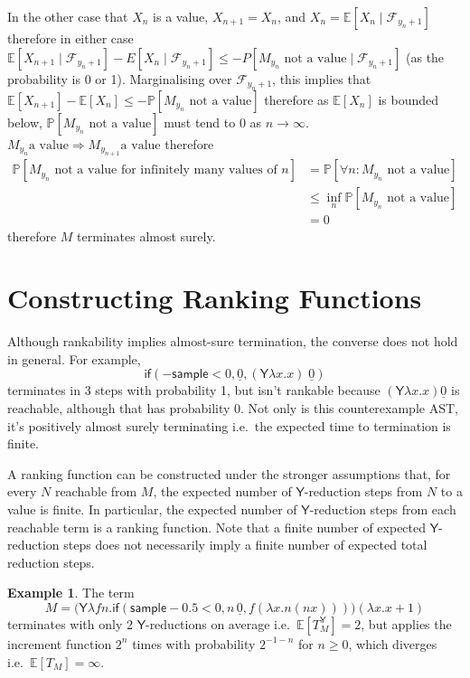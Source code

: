 \documentclass{article}
\newcommand\expect[1]{\mathbb{E}[#1]}
\newcommand{\tY}{\mathsf{Y}}
\newcommand{\tif}[3]{\mathsf{if}(#1, #2, #3)} %
\newcommand{\tsample}{\mathsf{sample}}
\theoremstyle{definition}
\newtheorem{example}{Example}
\theoremstyle{lemma}
\theoremstyle{remark}
\begin{document}
In the other case that $X_n$ is a value, $X_{n+1} = X_n$, and $X_n = \mathbb E[X_n \mid \mathcal F_{y_n+1}]$ therefore in either case $\mathbb E[X_{n+1} \mid \mathcal F_{y_n+1}] - E[X_n \mid \mathcal F_{y_n+1}] \leq \mathbb -P[M_{y_n} \text{ not a value} \mid \mathcal F_{y_n+1}]$ (as the probability is 0 or 1). Marginalising over $\mathcal F_{y_n+1}$, this implies that $\mathbb{E}[X_{n+1}] - \mathbb{E}[X_{n}] \leq -\mathbb P[M_{y_n} \text{ not a value}]$ therefore as $\mathbb{E}[X_n]$ is bounded below, $\mathbb P[M_{y_n} \text{ not a value}]$ must tend to 0 as $n \to \infty$. $M_{y_n} \text{a value} \Rightarrow M_{y_{n+1}} \text{a value}$ therefore 
\begin{align*}
\mathbb P[M_{y_n} \text{ not a value for infinitely many values of $n$}]  
& = \mathbb P[\forall n: M_{y_n} \text{ not a value}] \\
& \leq \inf_n \mathbb P[M_{y_n} \text{ not a value}] \\
& = 0
\end{align*} 
therefore $M$ terminates almost surely.



\section{Constructing Ranking Functions}
Although rankability implies almost-sure termination, the converse does not hold in general. For example,
\begin{equation}
\tif{{-}\tsample < 0}{\underline{0}}{(\tY \lambda x. x) \; \underline 0}
\label{ex:0 probability reachable}
\end{equation}
terminates in 3 steps with probability 1, but isn't rankable because $(\tY \lambda x. x) \underline 0$ is reachable, although that has probability 0. 
Not only is this counterexample AST, it's positively almost surely terminating i.e.~the expected time to termination is finite.

A ranking function can be constructed under the stronger assumptions that, for every $N$ reachable from $M$, the expected number of $\tY$-reduction steps from $N$ to a value is finite. In particular, the expected number of $\tY$-reduction steps from each reachable term is a ranking function. Note that a finite number of expected $\tY$-reduction steps does not necessarily imply a finite number of expected total reduction steps.

\begin{example}
\label{ex:tY finite does not imply t finite}
The term
\[
M = \big(\tY \lambda f n. \tif{\tsample - 0.5 < 0}{n \, \underline 0}{f (\lambda x. n (n x))}\big) (\lambda x. x+1)
\] 
terminates with only 2 $\tY$-reductions on average i.e.~$\expect{T_M^\tY} = 2$, but applies the increment function $2^n$ times with probability $2^{-1-n}$ for $n \geq 0$, which diverges i.e.~$\expect{T_M} = \infty$.
\end{example}
\end{document}
